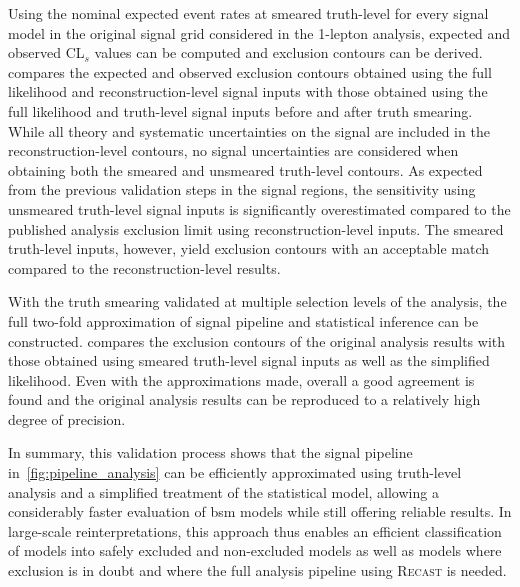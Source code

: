 Using the nominal expected event rates at smeared truth-level for every signal model in the original signal grid considered in the 1-lepton analysis, expected and observed CL$_s$ values can be computed and exclusion contours can be derived.  compares the expected and observed exclusion contours obtained using the full likelihood and reconstruction-level signal inputs with those obtained using the full likelihood and truth-level signal inputs before and after truth smearing. While all theory and systematic uncertainties on the signal are included in the reconstruction-level contours, no signal uncertainties are considered when obtaining both the smeared and unsmeared truth-level contours. As expected from the previous validation steps in the signal regions, the sensitivity using unsmeared truth-level signal inputs is significantly overestimated compared to the published analysis exclusion limit using reconstruction-level inputs. The smeared truth-level inputs, however, yield exclusion contours with an acceptable match compared to the reconstruction-level results.

With the truth smearing validated at multiple selection levels of the analysis, the full two-fold approximation of signal pipeline and statistical inference can be constructed.  compares the exclusion contours of the original analysis results with those obtained using smeared truth-level signal inputs as well as the simplified likelihood. Even with the approximations made, overall a good agreement is found and the original analysis results can be reproduced to a relatively high degree of precision.

In summary, this validation process shows that the signal pipeline in~\cref{fig:pipeline_analysis} can be efficiently approximated using truth-level analysis and a simplified treatment of the statistical model, allowing a considerably faster evaluation of \gls{bsm} models while still offering reliable results. In large-scale reinterpretations, this approach thus enables an efficient classification of models into safely excluded and non-excluded models as well as models where exclusion is in doubt and where the full analysis pipeline using \textsc{Recast} is needed.


